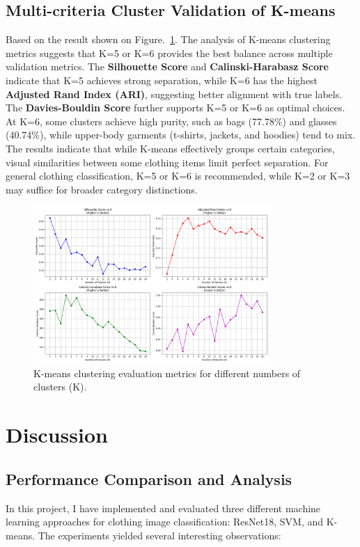 \documentclass[12pt]{article}
\begin{document}
    \subsection{Multi-criteria Cluster Validation of K-means}
    Based on the result shown on Figure.~\ref{fig:kmeans_metrics}. The analysis of K-means clustering metrics suggests that K=5 or K=6 provides the best balance across multiple validation metrics. The \textbf{Silhouette Score} and \textbf{Calinski-Harabasz Score} indicate that K=5 achieves strong separation, while K=6 has the highest \textbf{Adjusted Rand Index (ARI)}, suggesting better alignment with true labels. The \textbf{Davies-Bouldin Score} further supports K=5 or K=6 as optimal choices. At K=6, some clusters achieve high purity, such as bags (77.78\%) and glasses (40.74\%), while upper-body garments (t-shirts, jackets, and hoodies) tend to mix. The results indicate that while K-means effectively groups certain categories, visual similarities between some clothing items limit perfect separation. For general clothing classification, K=5 or K=6 is recommended, while K=2 or K=3 may suffice for broader category distinctions.
    \begin{figure}[h]
        \centering
        \includegraphics[width=0.8\textwidth]{figure/kmeans_metrics_comparison.png}
        \caption{K-means clustering evaluation metrics for different numbers of clusters (K).} 
        \label{fig:kmeans_metrics}
    \end{figure}
    
\section{Discussion}
    \subsection{Performance Comparison and Analysis}
    In this project, I have implemented and evaluated three different machine learning approaches for clothing image classification: ResNet18, SVM, and K-means. The experiments yielded several interesting observations:
    
\end{document}
